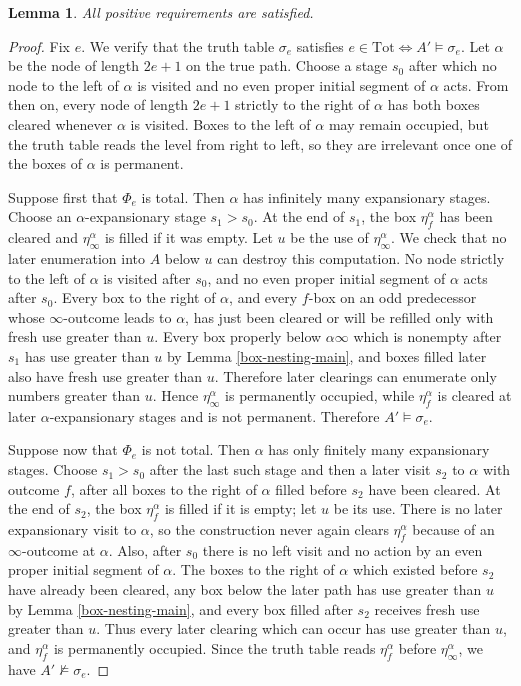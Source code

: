 \documentclass[10pt,a4paper]{amsart}
\newtheorem{lemma}[theorem]{Lemma}
\begin{document}
\begin{lemma}\label{pos}
All positive requirements are satisfied.
\end{lemma}

\begin{proof}
Fix $e$.  We verify that the truth table $\sigma_e$ satisfies $e\in\mathrm{Tot}\Longleftrightarrow A'\vDash\sigma_e$.
Let $\alpha$ be the node of length $2e+1$ on the true path.  Choose a stage
$s_0$ after which no node to the left of $\alpha$ is visited and no even proper
initial segment of $\alpha$ acts.  From then on, every node of length $2e+1$
strictly to the right of $\alpha$ has both boxes cleared whenever $\alpha$ is
visited.  Boxes to the left of $\alpha$ may remain occupied, but the truth table
reads the level from right to left, so they are irrelevant once one of the boxes
of $\alpha$ is permanent.

Suppose first that $\Phi_e$ is total.  Then $\alpha$ has infinitely many
expansionary stages.  Choose an $\alpha$-expansionary stage $s_1>s_0$.  At the
end of $s_1$, the box $\eta_f^\alpha$ has been cleared and
$\eta_\infty^\alpha$ is filled if it was empty.  Let $u$ be the use of
$\eta_\infty^\alpha$.  We check that no later enumeration into $A$ below $u$ can
destroy this computation.  No node strictly to the left of $\alpha$ is visited
after $s_0$, and no even proper initial segment of $\alpha$ acts after $s_0$.
Every box to the right of $\alpha$, and every $f$-box on an odd predecessor
whose $\infty$-outcome leads to $\alpha$, has just been cleared or will be
refilled only with fresh use greater than $u$.  Every box properly below
$\alpha\infty$ which is nonempty after $s_1$ has use greater than $u$ by Lemma
\ref{box-nesting-main}, and boxes filled later also have fresh use greater than
$u$.  Therefore later clearings can enumerate only numbers greater than $u$.
Hence $\eta_\infty^\alpha$ is permanently occupied, while $\eta_f^\alpha$ is
cleared at later $\alpha$-expansionary stages and is not permanent.  Therefore
$A'\vDash\sigma_e$.

Suppose now that $\Phi_e$ is not total.  Then $\alpha$ has only finitely many
expansionary stages.  Choose $s_1>s_0$ after the last such stage and then a
later visit $s_2$ to $\alpha$ with outcome $f$, after all boxes to the right of
$\alpha$ filled before $s_2$ have been cleared.  At the end of $s_2$, the box
$\eta_f^\alpha$ is filled if it is empty; let $u$ be its use.  There is no later
expansionary visit to $\alpha$, so the construction never again clears
$\eta_f^\alpha$ because of an $\infty$-outcome at $\alpha$.  Also, after $s_0$
there is no left visit and no action by an even proper initial segment of
$\alpha$.  The boxes to the right of $\alpha$ which existed before $s_2$ have
already been cleared, any box below the later path has use greater than $u$ by
Lemma \ref{box-nesting-main}, and every box filled after $s_2$ receives fresh
use greater than $u$.  Thus every later clearing which can occur has use greater
than $u$, and $\eta_f^\alpha$ is permanently occupied.  Since the truth table
reads $\eta_f^\alpha$ before $\eta_\infty^\alpha$, we have
$A'\nvDash\sigma_e$.
\end{proof}
\end{document}
